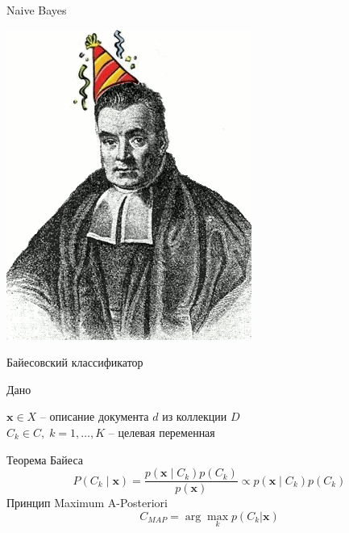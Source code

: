 \documentclass[aspectratio=169]{beamer}
\begin{document}
\begin{frame}{}

\begin{center}
\Large Naive Bayes

\vspace{1em}
\includegraphics[height=0.6\textheight]{images/bayes.png}
\end{center}

\end{frame}

\begin{frame}{Байесовский классификатор}

Дано

$\mathbf{x} \in X$ -- описание документа $d$ из коллекции $D$ \\
$C_k \in C, \; k = 1,\ldots,K$ -- целевая переменная

\vspace{1em}
Теорема Байеса
\[
P(C_k \mid \mathbf{x}) = \frac{p(\mathbf{x} \mid C_k) p(C_k)}{p(\mathbf{x})} \propto p(\mathbf{x} \mid C_k) p(C_k)
\]
Принцип Maximum A-Posteriori
\[
C_{MAP} = \arg \max_k p(C_k | \mathbf{x})
\]

\end{frame}

\end{document}
